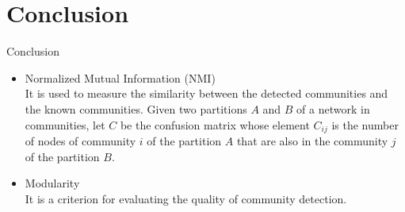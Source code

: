 \documentclass[aspectratio=169,xcolor=dvipsnames]{beamer}
\begin{document}
\section{Conclusion}

\begin{frame}{Conclusion}
    \begin{itemize}
        \item Normalized Mutual Information (NMI) \\
        It is used to measure the similarity between the detected communities and the known communities. Given two partitions $A$ and $B$ of a network in communities, let $C$ be the confusion matrix whose element $C_{ij}$ is the number of nodes of community $i$ of the partition $A$ that are also in the community $j$ of the partition $B$.
        \item Modularity \\
        It is a criterion for evaluating the quality of community detection.
    \end{itemize}
\end{frame}




\end{document}
